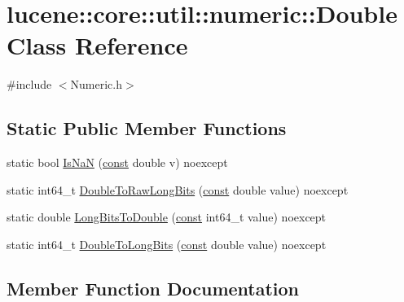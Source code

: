 \hypertarget{classlucene_1_1core_1_1util_1_1numeric_1_1Double}{}\section{lucene\+:\+:core\+:\+:util\+:\+:numeric\+:\+:Double Class Reference}
\label{classlucene_1_1core_1_1util_1_1numeric_1_1Double}


{\ttfamily \#include $<$Numeric.\+h$>$}

\subsection*{Static Public Member Functions}
\begin{DoxyCompactItemize}
\item 
static bool \mbox{\hyperlink{classlucene_1_1core_1_1util_1_1numeric_1_1Double_a90f6bdede8ad6bb030246fc9f63c001d}{Is\+NaN}} (\mbox{\hyperlink{ZlibCrc32_8h_a2c212835823e3c54a8ab6d95c652660e}{const}} double v) noexcept
\item 
static int64\+\_\+t \mbox{\hyperlink{classlucene_1_1core_1_1util_1_1numeric_1_1Double_a9063631b5b6ca044176db4f86a9f0e19}{Double\+To\+Raw\+Long\+Bits}} (\mbox{\hyperlink{ZlibCrc32_8h_a2c212835823e3c54a8ab6d95c652660e}{const}} double value) noexcept
\item 
static double \mbox{\hyperlink{classlucene_1_1core_1_1util_1_1numeric_1_1Double_adf20eb260f0f99ef904e88be601b15f5}{Long\+Bits\+To\+Double}} (\mbox{\hyperlink{ZlibCrc32_8h_a2c212835823e3c54a8ab6d95c652660e}{const}} int64\+\_\+t value) noexcept
\item 
static int64\+\_\+t \mbox{\hyperlink{classlucene_1_1core_1_1util_1_1numeric_1_1Double_a565f2ddcd3f5f813656d54cf2f9b15c1}{Double\+To\+Long\+Bits}} (\mbox{\hyperlink{ZlibCrc32_8h_a2c212835823e3c54a8ab6d95c652660e}{const}} double value) noexcept
\end{DoxyCompactItemize}


\subsection{Member Function Documentation}
\mbox{\label{classlucene_1_1core_1_1util_1_1numeric_1_1Double_a565f2ddcd3f5f813656d54cf2f9b15c1}} 
